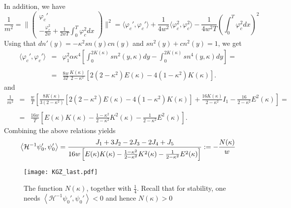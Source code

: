 \documentclass[final,11pt,leqno]{amsart}
\begin{document}
In addition, we have
          $${\frac{1}{m^2}}=\|\left( \begin{array}{cc}  {\varphi}_c'\\
          -{\frac{{\varphi}_c^2}{2w}}+{\frac{1}{2wT}}\int_{0}^{T}{{\varphi}_c^2}dx
          \end{array}\right) \|^2=\langle {\varphi}_c', {\varphi}_c'\rangle+{\frac{1}{4w^2}}\langle {\varphi}_c^2, {\varphi}_c^2\rangle-{\frac{1}{4w^2T}}\left( \int_{0}^{T}{{\varphi}_c^2}dx\right)^2$$
        Using that $dn'(y)=-\kappa^2sn(y)cn(y)$ and
        $sn^2(y)+cn^2(y)=1$, we get
          \begin{eqnarray*}
          \langle {\varphi}_c', {\varphi}_c'\rangle &=& {\varphi}_1^2\alpha
          \kappa^4\left[ \int_{0}^{2K(\kappa)}{sn^2(y, \kappa)}dy-\int_{0}^{2K(\kappa)}{sn^4(y,
          \kappa)}dy\right]=\\
          \\
          &=& {\frac{8w}{3T}}{\frac{K(\kappa)}{2-\kappa^2}}[2(2-\kappa^2)E(\kappa)-4(1-\kappa^2)K(\kappa)].
          \end{eqnarray*}
          and
          \begin{eqnarray*}
            {\frac{1}{m^2}}&= & {\frac{w}{T}}\left[
            {\frac{8K(\kappa)}{3(2-\kappa^2)}}[2(2-\kappa^2)E(\kappa)-4(1-\kappa^2)K(\kappa)]+{\frac{16K(\kappa)}{2-\kappa^2}}I_1-
            {\frac{16}{2-\kappa^2}}E^2(\kappa)\right]=\\
            \\
            &=& {\frac{16 w}{T}}\left[E(\kappa)K(\kappa)-{\frac{1-\kappa^2}{2-\kappa^2}}K^2(\kappa)-{\frac{1}{2-\kappa^2}}E^2(\kappa)\right].
            \end{eqnarray*}
         Combining the above relations yields
\begin{equation}
\label{z001}
         \left\langle {\mathcal H}^{-1}\psi_0', \psi_0'\right\rangle ={\frac{J_1+3J_2-2J_3-2J_4+J_5}{16 w\left[
            E(\kappa)K(\kappa)-{\frac{1-\kappa^2}{2-\kappa^2}}K^2(\kappa)-{\frac{1}{2-\kappa^2}}E^2(\kappa)\right]}}\\
             :={-\frac{N(\kappa)}{w   }}
\end{equation}
\begin{figure}[h10]
\centering
\texttt{[image: KGZ\_last.pdf]}
\caption{The  function $N({\kappa})$, together with ${\frac{{1}}{{4}}}$. Recall that for stability, one needs $\left\langle {\mathcal H}^{-1}\psi_0', \psi_0'\right\rangle<0$ and hence $N({\kappa})>0$}
\label{fig10}
\end{figure}
\end{document}
